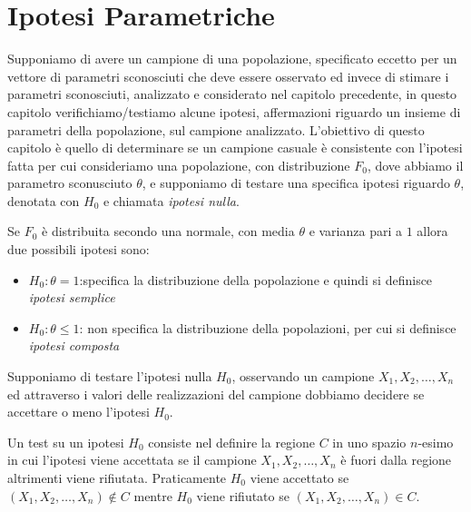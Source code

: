 \chapter{Ipotesi Parametriche}
Supponiamo di avere un campione di una popolazione, specificato eccetto per un vettore di parametri sconosciuti che deve
essere osservato ed invece di stimare i parametri sconosciuti, analizzato e considerato nel capitolo precedente, in
questo capitolo verifichiamo/testiamo alcune ipotesi, affermazioni riguardo un insieme di parametri della popolazione,
sul campione analizzato.\newline
L'obiettivo di questo capitolo è quello di determinare se un campione casuale è consistente con l'ipotesi fatta per cui
consideriamo una popolazione, con distribuzione $F_0$, dove abbiamo il parametro sconusciuto $\theta$, e supponiamo di
testare una specifica ipotesi riguardo $\theta$, denotata con $H_0$ e chiamata \emph{ipotesi nulla}.

Se $F_0$ è distribuita secondo una normale, con media $\theta$ e varianza pari a $1$ allora due possibili ipotesi sono:
\begin{itemize}
    \item $H_0: \theta = 1$:specifica la distribuzione della popolazione e quindi si definisce \emph{ipotesi semplice}
    \item $H_0: \theta \leq 1$: non specifica la distribuzione della popolazioni, per cui si definisce \emph{ipotesi composta}
\end{itemize}
Supponiamo di testare l'ipotesi nulla $H_0$, osservando un campione $X_1, X_2, \dots, X_n$ ed attraverso i valori delle
realizzazioni del campione dobbiamo decidere se accettare o meno l'ipotesi $H_0$.

Un test su un ipotesi $H_0$ consiste nel definire la regione $C$ in uno spazio $n$-esimo in cui l'ipotesi viene
accettata se il campione $X_1, X_2, \dots, X_n$ è fuori dalla regione altrimenti viene rifiutata.\newline
Praticamente $H_0$ viene accettato se $(X_1, X_2, \dots, X_n) \not \in C$ 
mentre $H_0$ viene rifiutato se $(X_1, X_2, \dots, X_n) \in C$.

